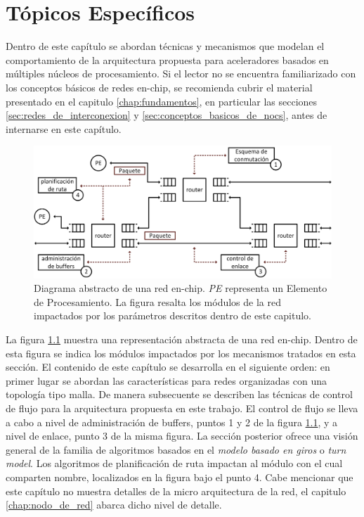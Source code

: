 
\chapter{Tópicos Específicos}
	\label{ch:topicos_selectos}

Dentro de este capítulo se abordan técnicas y mecanismos que modelan el comportamiento de la arquitectura propuesta para aceleradores basados en múltiples núcleos de procesamiento. Si el lector no se encuentra familiarizado con los conceptos básicos de redes en-chip, se recomienda cubrir el material presentado en el capitulo \ref{chap:fundamentos}, en particular las secciones \ref{sec:redes_de_interconexion} y \ref{sec:conceptos_basicos_de_nocs}, antes de internarse en este capítulo.

\begin{figure}
	\begin{center}
		\includegraphics[scale = 0.5]{figures/ch2_topicos_general.png}
	\end{center}
	\caption
		{	
			Diagrama abstracto de una red en-chip. \textit{PE} representa un Elemento de Procesamiento. La figura resalta los módulos de la red impactados por los parámetros descritos dentro de este capitulo.  
		}
	\label{fig:ch2_topicos_general}
\end{figure}

La figura \ref{fig:ch2_topicos_general} muestra una representación abstracta de una red en-chip. Dentro de esta figura se indica los módulos impactados por los mecanismos tratados en esta sección. El contenido de este capítulo se desarrolla en el siguiente orden: en primer lugar se abordan las características para redes organizadas con una topología tipo malla. De manera subsecuente se describen las técnicas de control de flujo para la arquitectura propuesta en este trabajo. El control de flujo se lleva a cabo a nivel de administración de buffers, puntos 1 y 2 de la figura \ref{fig:ch2_topicos_general}, y a nivel de enlace, punto 3 de la misma figura. La sección posterior ofrece una visión general de la familia de algoritmos basados en el \textit{modelo basado en giros} o \textit{turn model}. Los algoritmos de planificación de ruta impactan al módulo con el cual comparten nombre, localizados en la figura bajo el punto 4. Cabe mencionar que este capítulo no muestra detalles de la micro arquitectura de la red, el capitulo \ref{chap:nodo_de_red} abarca dicho nivel de detalle.



